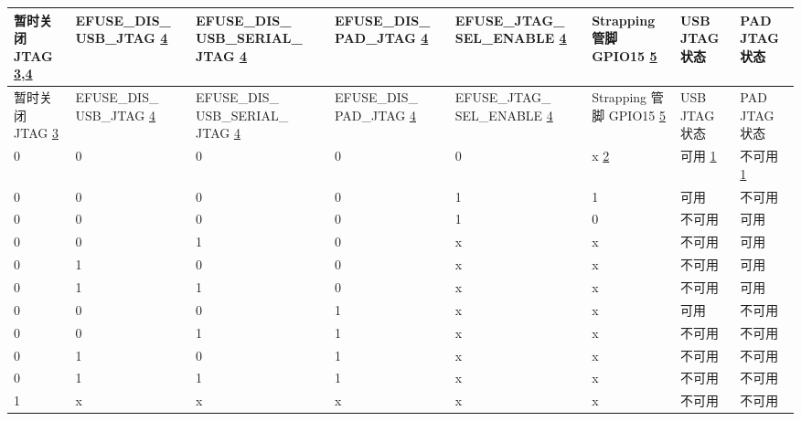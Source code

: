 
\begin{longtable}{ | p{1.4cm} | p{1.9cm} | p{2.1cm} | p{1.9cm} | p{2.1cm} | p{1.4cm} | p{1.7cm} | p{2.0cm} | }
\hline\rowcolor{lightgray}
暂时关闭 JTAG \hyperref[JTAG footnote: 3]{3},\hyperref[JTAG footnote: 4]{4} & EFUSE\_DIS\_ USB\_JTAG \hyperref[JTAG footnote: 4]{4} & EFUSE\_DIS\_ USB\_SERIAL\_ JTAG \hyperref[JTAG footnote: 4]{4} & EFUSE\_DIS\_ PAD\_JTAG \hyperref[JTAG footnote: 4]{4} & EFUSE\_JTAG\_ SEL\_ENABLE \hyperref[JTAG footnote: 4]{4} & Strapping 管脚 GPIO15 \hyperref[JTAG footnote: 5]{5} & USB JTAG 状态 & PAD JTAG 状态 \\ \hline
\endfirsthead
\hline
\rowcolor{lightgray}
暂时关闭 JTAG \hyperref[JTAG footnote: 3]{3} & EFUSE\_DIS\_ USB\_JTAG \hyperref[JTAG footnote: 4]{4} & EFUSE\_DIS\_ USB\_SERIAL\_ JTAG \hyperref[JTAG footnote: 4]{4} & EFUSE\_DIS\_ PAD\_JTAG \hyperref[JTAG footnote: 4]{4} & EFUSE\_JTAG\_ SEL\_ENABLE \hyperref[JTAG footnote: 4]{4} & Strapping 管脚 GPIO15  \hyperref[JTAG footnote: 5]{5} & USB JTAG 状态 & PAD JTAG 状态 \\ \hline
\hline
\endhead
\endfoot

0 & 0 & 0 & 0 & 0 & x \hyperref[JTAG footnote: 2]{2}	& 可用	 \hyperref[JTAG footnote: 1]{1}  &     不可用  \hyperref[JTAG footnote: 1]{1}  \\\hline
0 & 0 & 0 & 0 & 1 & 1	& 可用	 &  不可用   \\\hline
0 & 0 & 0 & 0 & 1 & 0	& 不可用 & 	可用 \\\hline
0 & 0 & 1 & 0 & x & x	& 不可用 & 	可用 \\\hline
0 & 1 & 0 & 0 & x & x	& 不可用 & 	可用 \\\hline
0 & 1 & 1 & 0 & x & x	& 不可用 & 	可用 \\\hline
0 & 0 & 0 & 1 & x & x	& 可用	 &  不可用 \\\hline
0 & 0 & 1 & 1 & x & x	& 不可用 & 	不可用 \\\hline
0 & 1 & 0 & 1 & x & x	& 不可用 & 	不可用 \\\hline
0 & 1 & 1 & 1 & x & x	& 不可用 & 	不可用 \\\hline
1 & x & x & x & x & x	& 不可用 & 	不可用 \\\hline

\end{longtable}


